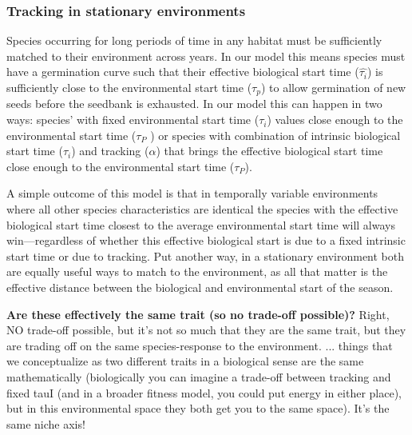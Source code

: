 \documentclass[11pt,letterpaper]{article}
\begin{document}
\subsubsection{Tracking in stationary environments}
Species occurring for long periods of time in any habitat must be sufficiently matched to their environment across years. In our model this means species must have a germination curve such that their effective biological start time ($\hat{\tau_{i}}$) is sufficiently close to the environmental start time ($\tau_{p}$) to allow germination of new seeds before the seedbank is exhausted. In our model this can happen in two ways: species' with fixed environmental start time ($\tau_i$) values close enough to the environmental start time ($\tau_P$ ) or species with combination of intrinsic biological start time ($\tau_i$) and tracking ($\alpha$) that brings the effective biological start time close enough to the environmental start time ($\tau_P$).


A simple outcome of this model is that in temporally variable environments where all other species characteristics are identical the species with the effective biological start time closest to the average environmental start time will always win---regardless of whether this effective biological start is due to a fixed intrinsic start time or due to tracking. Put another way, in a stationary environment both are equally useful ways to match to the environment, as all that matter is the effective distance between the biological and environmental start of the season. 

{\bf Are these effectively the same trait (so no trade-off possible)?} Right, NO trade-off possible, but it's not so much that they are the same trait, but they are trading off on the same species-response to the environment. ... things that we conceptualize as two different traits in a biological sense are the same mathematically (biologically you can imagine a trade-off between tracking and fixed tauI (and in a broader fitness model, you could put energy in either place), but in this environmental space they both get you to the same space). It's the same niche axis!
\end{document}
